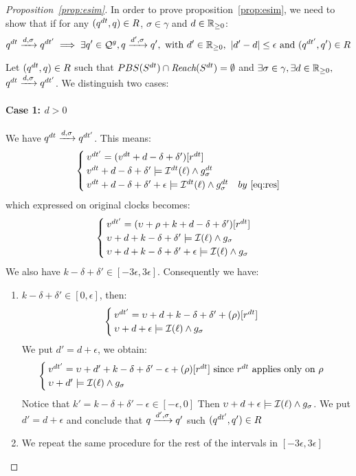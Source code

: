 \begin{proof}[Proposition~\ref{prop:esim}]
  
  In order to prove proposition~\ref{prop:esim}, we need to show that if for any 
  $(q^{dt},q)\in R$, $\sigma\in\gamma$ and $d\in\mathbb{R}_{\ge 0}$:
      \begin{displaymath}
        q^{dt}\xrightarrow{d,\sigma}q^{dt'} \implies \exists q'\in\mathcal{Q}^g, q\xrightarrow{d',\sigma}q',\text{ with } 
        d'\in\mathbb{R}_{\ge 0}, \ |d'-d|\le\epsilon \text{ and } (q^{dt'},q')\in R
      \end{displaymath}
       
      Let $(q^{dt},q)\in R$ such that $PBS(S^{dt})\cap\textit{Reach}(S^{dt})=\emptyset$ and $\exists\sigma\in\gamma,\exists d\in\mathbb{R}_{\ge 0},$ 
  $q^{dt}\xrightarrow{d,\sigma}q^{dt'}$. We distinguish two cases:
  \paragraph{\textbf{Case 1:} $d > 0$}
  We have $q^{dt} \xrightarrow{d,\sigma}q^{dt'}$. This means:
    \[
    \begin{cases}{}
      v^{dt'}=(v^{dt}+d-\delta+\delta')[r^{dt}] \\ 
      v^{dt} +d-\delta+\delta'\models\mathcal{I}^{dt}(\ell)\wedge g_{\sigma}^{dt} \\ 
      v^{dt} +d-\delta+\delta'+\epsilon\models\mathcal{I}^{dt}(\ell)\wedge g_{\sigma}^{dt}& by~\ref{eq:res} 
    \end{cases}\]
  which expressed on original clocks becomes:
    \[\begin{cases}{}
      v^{dt'}=(\upsilon+\rho+k+d-\delta+\delta')[r^{dt}]\\ 
      \upsilon+d+k-\delta+\delta'\models\mathcal{I}(\ell)\wedge g_{\sigma} \\ 
      \upsilon+d+k-\delta+\delta'+\epsilon\models\mathcal{I}(\ell)\wedge g_{\sigma} 
    \end{cases}\]
  We also have $k-\delta+\delta'\in[-3\epsilon,3\epsilon]$. Consequently we have: 
  
  \begin{enumerate}
    \item $k-\delta+\delta'\in[0,\epsilon]$, then:\\
      \[\begin{cases}{}
      v^{dt'}=\upsilon+d+k-\delta+\delta'+(\rho)[r^{dt}]\\ 
      \upsilon+d+\epsilon\models\mathcal{I}(\ell)\wedge g_{\sigma} \label{1} 
    \end{cases}\]
    We put $d'=d+\epsilon$, we obtain: 
      \[\begin{cases}
      v^{dt'}=\upsilon+d'+k-\delta+\delta'-\epsilon+(\rho)[r^{dt}] \text{ since } r^{dt}\text{ applies only on } \rho\\ 
      \upsilon+d'\models\mathcal{I}(\ell)\wedge g_{\sigma} \label{1} 
      \end{cases}\]
    Notice that $k'=k-\delta+\delta'-\epsilon\in[-\epsilon,0]$ 
      Then $\upsilon +d+\epsilon\models\mathcal{I}(\ell)\wedge g_{\sigma}$. We put $d'=d+\epsilon$ and conclude
      that $q\xrightarrow{d',\sigma}q'$ such $(q^{dt'},q')\in R$
    \item We repeat the same procedure for the rest of the intervals in $[-3\epsilon,3\epsilon]$
  \end{enumerate}
  

\end{proof}

